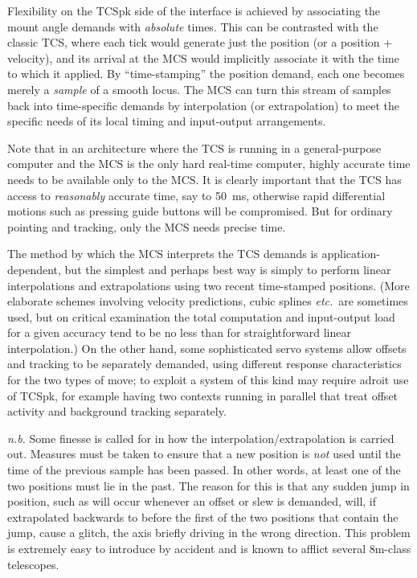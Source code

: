 \documentclass[12pt,fleqn,twoside]{article}
\renewcommand{\_}{{\tt\char'137}}     %
\begin{document}
Flexibility on the TCSpk side of the interface is achieved by associating
the mount angle demands with {\it absolute}\/ times.  This can be
contrasted with the classic TCS, where each tick would generate
just the position (or a position + velocity), and its arrival at
the MCS would implicitly
associate it with the time to which it applied.  By
``time-stamping'' the position demand, each one becomes merely a
{\it sample}\/ of a smooth locus.  The MCS can turn this
stream of samples back into
time-specific demands by interpolation (or extrapolation) to meet
the specific needs of its local timing and input-output
arrangements.

Note that in an architecture where the TCS is running in a
general-purpose computer and the MCS is the only hard real-time
computer, highly accurate time needs to be
available only to the MCS.  It is clearly important that the TCS
has access to {\it reasonably}\/ accurate time, say to 50~ms, otherwise
rapid differential motions such as pressing guide buttons will be
compromised.  But for ordinary pointing
and tracking, only the MCS needs precise time.

The method by which the MCS interprets the TCS demands is
application-dependent, but the simplest and perhaps best way is
simply to perform linear interpolations and extrapolations using
two recent time-stamped positions.  (More elaborate schemes involving
velocity predictions, cubic splines {\it etc.}~are sometimes
used, but on critical examination the total computation and
input-output load for a given accuracy tend to be no less than for
straightforward linear interpolation.)  On the other
hand, some sophisticated servo systems allow offsets and tracking to be
separately demanded, using different
response characteristics for the
two types of move;  to exploit a system of this kind may require
adroit use of TCSpk, for example having two contexts running in
parallel that treat offset activity and background tracking
separately.

\label{glitch}{\it n.b.} Some finesse is
called for in how the interpolation/extrapolation is carried out.
Measures must be taken to ensure that a new position is {\it not}\/
used until the time of the previous sample has been passed.  In
other words, at least one of the two positions must lie in the
past.  The
reason for this is that any sudden jump in position, such as will
occur whenever an offset or slew is demanded, will, if
extrapolated backwards
to before the first of the two positions that contain the jump, cause
a glitch, the axis briefly driving in the wrong direction.  This problem
is extremely easy to introduce by accident and is known to
afflict several 8m-class telescopes.
\end{document}
